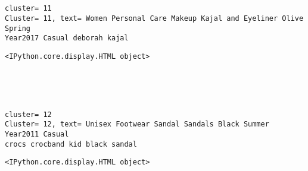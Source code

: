 \documentclass[11pt]{article}
\begin{document}
    
    \begin{center}
    \end{center}
    { \hspace*{\fill} \\}
    
    \begin{center}
    \end{center}
    { \hspace*{\fill} \\}
    
    \begin{Verbatim}[commandchars=\\\{\}]
cluster= 11
Cluster= 11, text= Women Personal Care Makeup Kajal and Eyeliner Olive Spring
Year2017 Casual deborah kajal
    \end{Verbatim}

    
    \begin{Verbatim}[commandchars=\\\{\}]
<IPython.core.display.HTML object>
    \end{Verbatim}

    
    \begin{center}
    \end{center}
    { \hspace*{\fill} \\}
    
    \begin{center}
    \end{center}
    { \hspace*{\fill} \\}
    
    \begin{Verbatim}[commandchars=\\\{\}]
cluster= 12
Cluster= 12, text= Unisex Footwear Sandal Sandals Black Summer Year2011 Casual
crocs crocband kid black sandal
    \end{Verbatim}

    
    \begin{Verbatim}[commandchars=\\\{\}]
<IPython.core.display.HTML object>
    \end{Verbatim}
\end{document}
